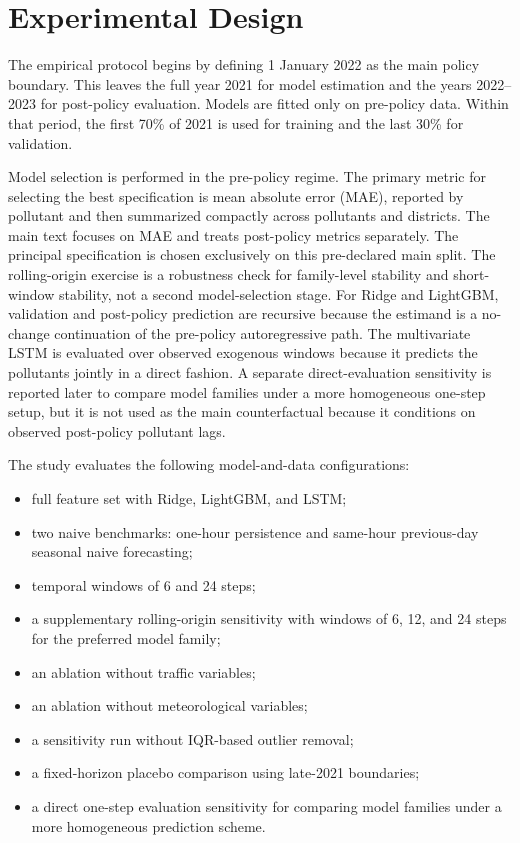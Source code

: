 \section{Experimental Design}\label{sec:design}

The empirical protocol begins by defining 1 January 2022 as the main policy boundary. This leaves the full year 2021 for model estimation and the years 2022--2023 for post-policy evaluation. Models are fitted only on pre-policy data. Within that period, the first 70\% of 2021 is used for training and the last 30\% for validation.

Model selection is performed in the pre-policy regime. The primary metric for selecting the best specification is mean absolute error (MAE), reported by pollutant and then summarized compactly across pollutants and districts. The main text focuses on MAE and treats post-policy metrics separately. The principal specification is chosen exclusively on this pre-declared main split. The rolling-origin exercise is a robustness check for family-level stability and short-window stability, not a second model-selection stage. For Ridge and LightGBM, validation and post-policy prediction are recursive because the estimand is a no-change continuation of the pre-policy autoregressive path. The multivariate LSTM is evaluated over observed exogenous windows because it predicts the pollutants jointly in a direct fashion. A separate direct-evaluation sensitivity is reported later to compare model families under a more homogeneous one-step setup, but it is not used as the main counterfactual because it conditions on observed post-policy pollutant lags.

The study evaluates the following model-and-data configurations:
\begin{itemize}
\item full feature set with Ridge, LightGBM, and LSTM;
\item two naive benchmarks: one-hour persistence and same-hour previous-day seasonal naive forecasting;
\item temporal windows of 6 and 24 steps;
\item a supplementary rolling-origin sensitivity with windows of 6, 12, and 24 steps for the preferred model family;
\item an ablation without traffic variables;
\item an ablation without meteorological variables;
\item a sensitivity run without IQR-based outlier removal;
\item a fixed-horizon placebo comparison using late-2021 boundaries;
\item a direct one-step evaluation sensitivity for comparing model families under a more homogeneous prediction scheme.
\end{itemize}

